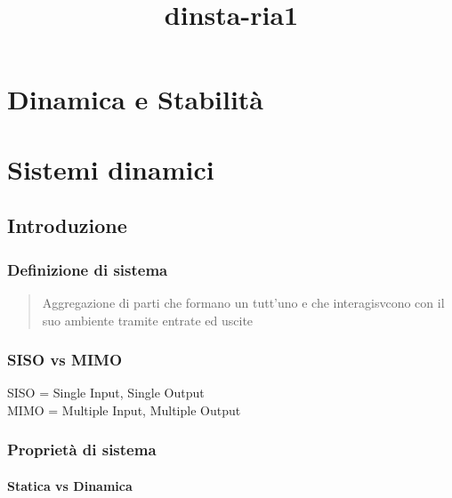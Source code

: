 \documentclass[11pt]{article}
\title{dinsta-ria1}
\begin{document}
    
    
    \maketitle
    
    

    
    \hypertarget{dinamica-e-stabilituxe0}{%
\section{Dinamica e Stabilità}\label{dinamica-e-stabilituxe0}}

    \hypertarget{sistemi-dinamici}{%
\section{Sistemi dinamici}\label{sistemi-dinamici}}

\hypertarget{introduzione}{%
\subsection{Introduzione}\label{introduzione}}

\hypertarget{definizione-di-sistema}{%
\subsubsection{Definizione di sistema}\label{definizione-di-sistema}}

\begin{quote}
Aggregazione di parti che formano un tutt'uno e che interagisvcono con
il suo ambiente tramite entrate ed uscite
\end{quote}

\hypertarget{siso-vs-mimo}{%
\subsubsection{SISO vs MIMO}\label{siso-vs-mimo}}

SISO = Single Input, Single Output\\
MIMO = Multiple Input, Multiple Output

\hypertarget{proprietuxe0-di-sistema}{%
\subsubsection{Proprietà di sistema}\label{proprietuxe0-di-sistema}}

\hypertarget{statica-vs-dinamica}{%
\paragraph{Statica vs Dinamica}\label{statica-vs-dinamica}}
\end{document}
